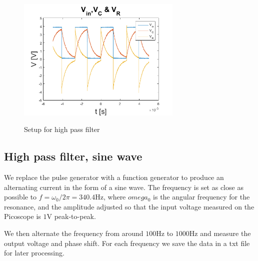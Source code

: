 \documentclass[../main/main.tex]{subfiles}
\begin{document}
\begin{figure}[!ht]
  \caption{Setup for high pass filter}
  \centering
    \includegraphics[width=0.7\textwidth]{../img/VinVCVR.png}
    \label{fig:VinVCVR}
\end{figure}

\subsection*{High pass filter, sine wave}

We replace the pulse generator with a function generator to produce an alternating current in the form of a sine wave.
The frequency is set as close as possible to \(  f = \omega_0 / 2 \pi = 340.4 \si{\hertz} \), where \( omega_0 \) is the angular frequency for the resonance, and the amplitude adjusted so that the input voltage measured on the Picoscope is \( 1 \si{\volt} \) peak-to-peak.

We then alternate the frequency from around \( 100 \si{\hertz} \) to \( 1000 \si{\hertz} \) and measure the output voltage and phase shift.
For each frequency we save the data in a txt file for later processing.
\end{document}
